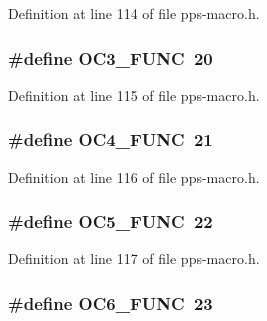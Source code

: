 Definition at line 114 of file pps-\/macro.\+h.

\hypertarget{pps-macro_8h_a03e82f82a541a4e050612833bcca748c}{}
\subsubsection[{O\+C3\+\_\+\+F\+U\+N\+C}]{\setlength{\rightskip}{0pt plus 5cm}\#define O\+C3\+\_\+\+F\+U\+N\+C~20}\label{pps-macro_8h_a03e82f82a541a4e050612833bcca748c}


Definition at line 115 of file pps-\/macro.\+h.

\hypertarget{pps-macro_8h_a4275d5e2522c9a1219a68d2c685c67c0}{}
\subsubsection[{O\+C4\+\_\+\+F\+U\+N\+C}]{\setlength{\rightskip}{0pt plus 5cm}\#define O\+C4\+\_\+\+F\+U\+N\+C~21}\label{pps-macro_8h_a4275d5e2522c9a1219a68d2c685c67c0}


Definition at line 116 of file pps-\/macro.\+h.

\hypertarget{pps-macro_8h_a366467101d1b3470f0671fa57e165854}{}
\subsubsection[{O\+C5\+\_\+\+F\+U\+N\+C}]{\setlength{\rightskip}{0pt plus 5cm}\#define O\+C5\+\_\+\+F\+U\+N\+C~22}\label{pps-macro_8h_a366467101d1b3470f0671fa57e165854}


Definition at line 117 of file pps-\/macro.\+h.

\hypertarget{pps-macro_8h_a6f2533707e9daa8b689fedcfd1b779bb}{}
\subsubsection[{O\+C6\+\_\+\+F\+U\+N\+C}]{\setlength{\rightskip}{0pt plus 5cm}\#define O\+C6\+\_\+\+F\+U\+N\+C~23}\label{pps-macro_8h_a6f2533707e9daa8b689fedcfd1b779bb}


